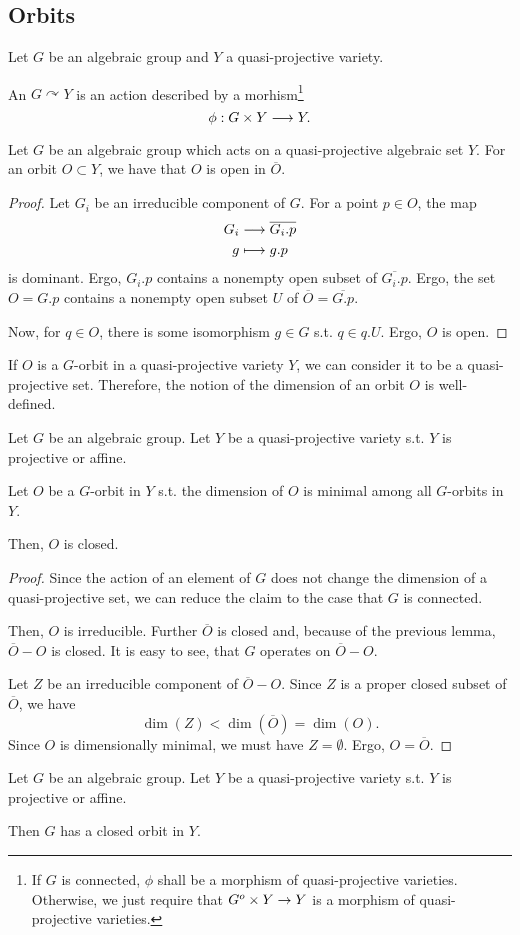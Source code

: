 \subsection{Orbits}
\begin{definition}
	Let $G$ be an algebraic group and $Y$ a quasi-projective variety.
	
	An  $G \curvearrowright Y$ is an action described by a morhism\footnote{
If $G$ is connected, $\phi$ shall be a morphism of quasi-projective varieties. Otherwise, we just require that $G^o \times Y \overset{}{\rightarrow} Y$ is a morphism of quasi-projective varieties.
}
	\[ \phi:G \times Y \overset{}{\longrightarrow} Y. \]
\end{definition}
\begin{lemma}
	Let $G$ be an algebraic group which acts on a quasi-projective algebraic set $Y$. For an orbit $O \subset Y$, we have that $O$ is open in $\overline{O}$.
\end{lemma}
\begin{proof}
Let $G_i$ be an irreducible component of $G$. For a point $p \in O$, the map
\begin{align*}
G_i & \overset{}{\longrightarrow} \overline{G_i.p}\\
g & \longmapsto g.p
\end{align*}	
is dominant. Ergo, $G_i.p$ contains a nonempty open subset of $\overline{G_i.p}$. Ergo, the set $O = G.p$ contains a nonempty open subset $U$ of $\overline{O} = \overline{G.p}$.

Now, for $q \in O$, there is some isomorphism $g \in G$ s.t. $q \in q.U$. Ergo, $O$ is open.
\end{proof}

\begin{definition}
	If $O$ is a $G$-orbit in a quasi-projective variety $Y$, we can consider it to be a quasi-projective set. Therefore, the notion of the dimension of an orbit $O$ is well-defined.
\end{definition}

\begin{lemma}
Let $G$ be an algebraic group. Let $Y$ be a quasi-projective variety s.t. $Y$ is projective or affine.

Let $O$ be a $G$-orbit in $Y$ s.t. the dimension of $O$ is minimal among all $G$-orbits in $Y$.

Then, $O$ is closed.
\end{lemma}
\begin{proof}
	Since the action of an element of $G$ does not change the dimension of a quasi-projective set, we can reduce the claim to the case that $G$ is connected.
	
	Then, $O$ is irreducible. Further $\overline{O}$ is closed and, because of the previous lemma, $\overline{O} - O$ is closed. It is easy to see, that $G$ operates on $\overline{O} - O$.
	
	Let $Z$ be an irreducible component of $\overline{O} - O$.
	Since $Z$ is a proper closed subset of $\overline{O}$, we have
	\[ \dim(Z) < \dim(\overline{O}) = \dim(O). \]
	Since $O$ is dimensionally minimal, we must have $Z = \emptyset$. Ergo, $O = \overline{O}$.
\end{proof}

\begin{corollary}
Let $G$ be an algebraic group. Let $Y$ be a quasi-projective variety s.t. $Y$ is projective or affine.

Then $G$ has a closed orbit in $Y$.
\end{corollary}
